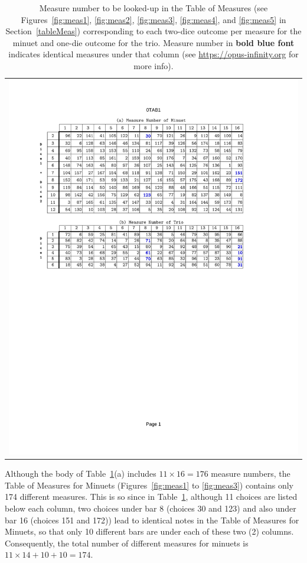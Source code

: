 \documentclass[a4paper,x11names,svgnames,10pt]{article}
\begin{document}
{\begin{table}[H]
	\centering
	\begin{tabular}{c}
		\centering
		\includegraphics[clip=true,trim=0.90in 5.40in 1.25in 1.10in,scale=0.90]{gf-TAB}
	\end{tabular}
	\caption{Measure number to be looked-up in the Table of Measures (see Figures~\ref{fig:meas1}, \ref{fig:meas2}, \ref{fig:meas3}, \ref{fig:meas4}, and \ref{fig:meas5} in Section~\ref{tableMeas}) corresponding to each two-dice outcome per measure for the minuet and one-die outcome for the trio. Measure number in {\bf\color{blue}bold blue font} indicates identical measures under that column (see  \href{https://opus-infinity.org/dice_games/stadler_menuet_trio/tables/}{https://opus-infinity.org} for more info).}
	\label{fig:0tab1}
\end{table}

Although the body of Table~\ref{fig:0tab1}(a) includes $11\times 16 = 176$ measure numbers, the Table of Measures for Minuets (Figures~\ref{fig:meas1} to \ref{fig:meas3}) contains only 174 different measures.  This is so since in Table~\ref{fig:0tab1}, although 11 choices are listed below each column, two choices under bar 8 (choices 30 and 123) and also under bar 16 (choices 151 and 172)) lead to identical notes in the Table of Measures for Minuets, so that only 10 different bars are under each of these two (2) columns. Consequently, the total number of different measures for minuets is $11\times 14 + 10 + 10 = 174$. \\

}
\end{document}
